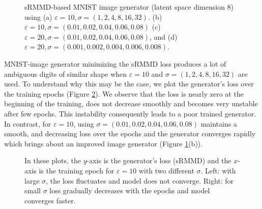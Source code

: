 \documentclass{article}
\theoremstyle{definition}
\begin{document}
\begin{figure}[H] 
  \centering
{}\hspace{-8mm}
\hspace{-8mm}
\hspace{-8mm}
  \caption{sRMMD-based MNIST image generator (latent space dimension 8) using (a) $\varepsilon= 10,\sigma =(1,2,4,8,16,32)$. (b) $\varepsilon= 10, \sigma =(0.01, 0.02, 0.04, 0.06, 0.08)$ (c) $\varepsilon= 20, \sigma =(0.01, 0.02, 0.04, 0.06, 0.08)$, and (d) $\varepsilon= 20, \sigma =(0.001, 0.002, 0.004, 0.006, 0.008)$.}
  \label{fig:mnist_result_supp}
\end{figure}
MNIST-image generator minimizing the sRMMD loss produces a lot of ambiguous digits of similar shape when $\varepsilon = 10$ and $\sigma =(1, 2, 4, 8, 16, 32)$ are used. To understand why this may be the case, we plot the generator's loss over the training epochs (Figure \ref{fig:loss_mnist_result_supp}). We observe that the loss is nearly zero at the beginning of the training, does not decrease smoothly and becomes very unstable after few epochs. This instability consequently leads to a poor trained generator. In contrast, for $\varepsilon=10$, using $\sigma = (0.01, 0.02, 0.04, 0.06, 0.08)$ maintains a smooth, and decreasing loss over the epochs and the generator converges rapidly which brings about an improved image generator (Figure \ref{fig:mnist_result_supp}(b)).
\begin{figure}[H] 
  \centering
{}\hspace{8mm}
\hspace{8mm}
  \caption{In these plots, the $y$-axis is the generator's loss (sRMMD) and the $x$-axis is the training epoch for $\varepsilon =10$ with two different $\sigma$. Left: with large $\sigma$, the loss fluctuates and model does not converge. Right: for small $\sigma$ loss gradually decreases with the epochs and model converges faster.}
  \label{fig:loss_mnist_result_supp}
  \vspace{-4mm}
\end{figure}
\end{document}

